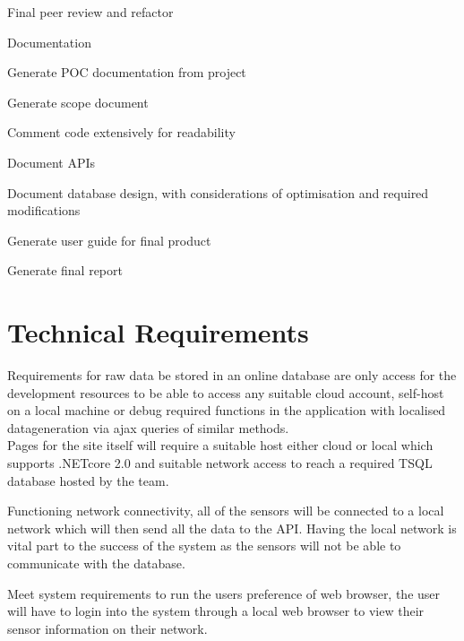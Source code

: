 \documentclass{article}
\begin{document}
\begin{legal}
\begin{legal}
                    \item Final peer review and refactor
                \end{legal}
                \newpage
                \item Documentation
                \begin{legal}
                    \item Generate POC documentation from project
                    \item Generate scope document
                    \item Comment code extensively for readability
                    \item Document APIs
                    \item Document database design, with considerations of optimisation and required modifications
                    \item Generate user guide for final product
                    \item Generate final report
                \end{legal}
            \end{legal}
        \newpage
    
    \section{Technical Requirements}
        Requirements for raw data be stored in an online database are only access
        for the development resources to be able to access any suitable cloud account, 
        self-host on a local machine or debug required functions in the application with 
        localised datageneration via ajax queries of similar methods.
        \\
        Pages for the site itself will require a suitable host either cloud or local which
        supports .NETcore 2.0\cite{DotNetCore2} and suitable network access to reach a
        required TSQL\cite{TSQL} database hosted by the team.
        \vspace{5mm}

        Functioning network connectivity, all of the sensors will be connected to a local network which will 
        then send all the data to the API. Having the local network is vital part to the success of the system 
        as the sensors will not be able to communicate with the database.
        \par
        Meet system requirements to run the users preference of web browser, the user will have to login into 
        the system through a local web browser to view their sensor information on their network.
        \vspace{5mm}
\end{document}
